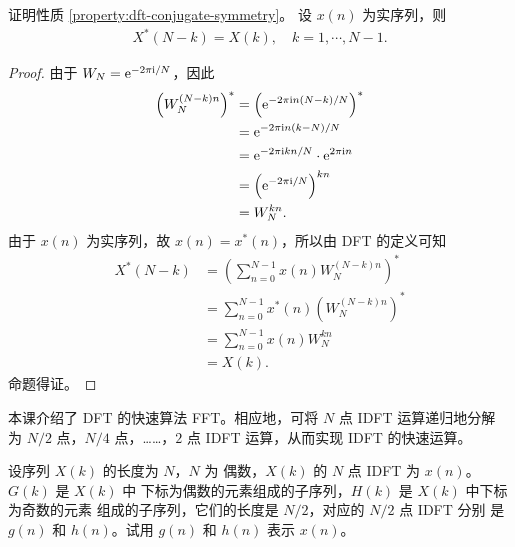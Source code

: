 \begin{homework}
    证明性质 \ref{property:dft-conjugate-symmetry}。
    设 $x(n)$ 为实序列，则
    \begin{align*}
        X^*(N - k) = X(k), \quad k = 1, \cdots, N - 1.
    \end{align*}
\end{homework}

\begin{proof}
    由于 $W_N = \mathrm{e}^{-2\pi\mathrm{i}/N}$，因此
    \begin{align*}
        \left(W_N^{(N - k)n}\right)^* & = \left(\mathrm{e}^{-2\pi\mathrm{i} n(N-k)/N}\right)^* \\
        & = \mathrm{e}^{-2\pi\mathrm{i} n(k-N)/N} \\
        & = \mathrm{e}^{-2\pi\mathrm{i} kn/N} \cdot \mathrm{e}^{2\pi\mathrm{i} n} \\
        & = \left(\mathrm{e}^{-2\pi\mathrm{i}/N}\right)^{kn} \\
        & = W_N^{kn}.
    \end{align*}
    由于 $x(n)$ 为实序列，故 $x(n) = x^*(n)$，所以由 DFT 的定义可知
    \begin{align*}
        X^*(N - k) & = \left(\sum_{n = 0}^{N - 1} x(n)W_N^{(N - k)n}\right)^* \\
        & = \sum_{n = 0}^{N - 1} x^*(n)\left(W_N^{(N - k)n}\right)^* \\
        & = \sum_{n = 0}^{N - 1} x(n)W_N^{kn} \\
        & = X(k).
    \end{align*}
    命题得证。
\end{proof}

\begin{homework}
    本课介绍了 DFT 的快速算法 FFT。相应地，可将 $N$ 点 IDFT 运算递归地分解
    为 $N/2$ 点，$N/4$ 点，……，$2$ 点 IDFT 运算，从而实现 IDFT 的快速运算。

    设序列 $X(k)$ 的长度为 $N$，$N$ 为
    偶数，$X(k)$ 的 $N$ 点 IDFT 为 $x(n)$。$G(k)$ 是 $X(k)$ 中
    下标为偶数的元素组成的子序列，$H(k)$ 是 $X(k)$ 中下标为奇数的元素
    组成的子序列，它们的长度是 $N/2$，对应的 $N/2$ 点 IDFT 分别
    是 $g(n)$ 和 $h(n)$。试用 $g(n)$ 和 $h(n)$ 表示 $x(n)$。
\end{homework}


